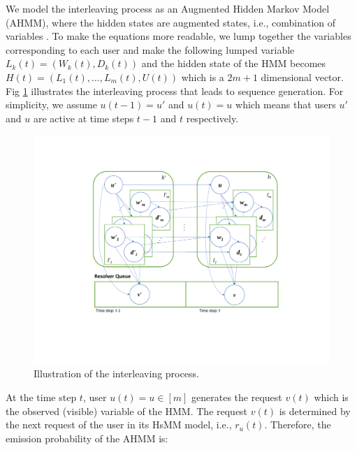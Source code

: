 	We model the interleaving process as an Augmented Hidden Markov Model (AHMM), where the hidden states are augmented states, i.e., combination of variables \cite{minot2014separation}. 
	To make the equations more readable, we lump together the variables corresponding to each user and make the following lumped variable $L_k(t) = (W_{k}(t), D_{k}(t))$ and the hidden state of the HMM becomes $H(t) = (L_1(t), \dots, L_m(t), U(t))$ which is a $2m +1$ dimensional vector.
	Fig \ref{fig:rq} illustrates the interleaving process that leads to sequence generation.
	For simplicity, we assume $u(t-1) = u'$ and $u(t) = u$ which means that users $u'$ and $u$ are active at time steps $t-1$ and $t$ respectively. 
	\begin{figure}
		\centering
		\includegraphics[width=.45\textwidth]{./img/hsmm-q2}
		\caption{Illustration of the interleaving process.}
		\label{fig:rq}
	\end{figure} 
	
	At the time step $t$, user $u(t) = u \in [m]$ generates the request $v(t)$ which is the observed (visible) variable of the HMM.
	The request $v(t)$ is determined by the next request of the user in its HsMM model, i.e., $r_{u}(t)$.	
	Therefore, the emission probability of the AHMM is:

